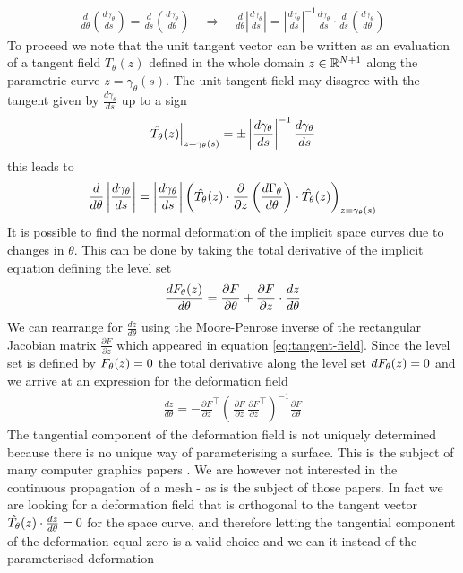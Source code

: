 \begin{align}
    \frac{d}{d\theta}\left(\frac{d\gamma_{\theta}}{ds}\right)
    = \frac{d}{ds}\left(\frac{d\gamma_{\theta}}{d\theta}\right)
    \quad\Rightarrow\quad
    \frac{d}{d\theta}\left|\frac{d\gamma_{\theta}}{ds}\right|=
    \left|\frac{d\gamma_{\theta}}{ds}\right|^{-1}
    \frac{d\gamma_{\theta}}{ds}\cdot\frac{d}{d s}
    \left(\frac{d\gamma_{\theta}}{d\theta}\right)
\end{align}
To proceed we note that the unit tangent vector can be written as an evaluation of a tangent field $\hat{T}_{\theta}(z)$ defined in the whole domain $z\in\mathbb{R}^{N+1}$ along the parametric curve $z=\gamma_{\theta}(s)$. The unit tangent field may disagree with the tangent given by $\frac{d\gamma_{\theta}}{ds}$ up to a sign
\begin{align}
    \left.\hat{T_{\theta}}(z)\right|_{z=\gamma_{\theta}(s)}=
    \pm\left|\frac{d\gamma_{\theta}}{ds}\right|^{-1}\frac{d\gamma_{\theta}}{d s}
\end{align}
this leads to
\begin{align}
    \frac{d}{d\theta}\left|\frac{d\gamma_{\theta}}{ds}\right|=
    \left|\frac{d\gamma_{\theta}}{ds}\right|\left(
   \hat{T_{\theta}}(z)\cdot\frac{\partial }{\partial z}\left(\frac{d\Gamma_{\theta}}{d \theta}\right)\cdot
   \hat{T_{\theta}}(z)
    \right)_{z=\gamma_\theta(s)}
    \label{eq:divergence-term}
\end{align}
It is possible to find the normal deformation of the implicit space curves due to changes in $\theta$. This can be done by taking the total derivative of the implicit equation defining the level set
\begin{align}
    \frac{dF_{\theta}(z)}{d\theta}=\frac{\partial F}{\partial\theta}+
    \frac{\partial F}{\partial z}\cdot\frac{d z}{d \theta}
\end{align}
We can rearrange for $\frac{d z}{d \theta}$ using the Moore-Penrose inverse of the rectangular Jacobian matrix $\frac{\partial F}{\partial z}$ which appeared in equation \eqref{eq:tangent-field}. Since the level set is defined by $F_{\theta}(z)=0$ the total derivative along the level set $dF_{\theta}(z)=0$ and we arrive at an expression for the deformation field \cite{Jos2011OnSurface}
\begin{align}
    \frac{d z}{d \theta} = - \frac{\partial F}{\partial z}^\top
    \left(\,
        \frac{\partial F}{\partial z}\,\frac{\partial F}{\partial z}^\top
    \right)^{-1}
    \frac{\partial F}{\partial\theta}
\end{align}
The tangential component of the deformation field is not uniquely determined because there is no unique way of parameterising a surface. This is the subject of many computer graphics papers \cite{Jos2011OnSurface,Tao2016Near-IsometricTracking,Fujisawa2013CalculationInvariance}. We are however not interested in the continuous propagation of a mesh - as is the subject of those papers. In fact we are looking for a deformation field that is orthogonal to the tangent vector $\hat{T_{\theta}}(z) \cdot\frac{d z}{d\theta} =0$ for the space curve, and therefore letting the tangential component of the deformation equal zero is a valid choice and we can it instead of the parameterised deformation
